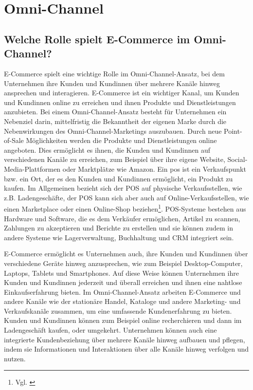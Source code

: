 \clearpage
\section{Omni-Channel}\label{hauptabschnitt_3}

\subsection{Welche Rolle spielt E-Commerce im Omni-Channel?}\label{unterabschnitt_3_1}
E-Commerce spielt eine wichtige Rolle im Omni-Channel-Ansatz, bei dem Unternehmen ihre Kunden und Kundinnen  über mehrere Kanäle hinweg ansprechen und interagieren. E-Commerce ist ein wichtiger Kanal, um Kunden und Kundinnen  online zu erreichen und ihnen Produkte und Dienstleistungen anzubieten.
\newline
Bei einem Omni-Channel-Ansatz besteht für Unternehmen ein Nebenziel darin, mittelfristig die Bekanntheit der eigenen Marke durch die Nebenwirkungen des Omni-Channel-Marketings auszubauen. Durch neue Point-of-Sale Möglichkeiten werden die Produkte und Dienstleistungen online angeboten. Dies ermöglicht es ihnen, die Kunden und Kundinnen auf verschiedenen Kanäle zu erreichen, zum Beispiel über ihre eigene Website, Social-Media-Plattformen oder Marktplätze wie Amazon.
\newline
Ein \ac{pos} ist ein Verkaufspunkt bzw. ein Ort, der es den Kunden und Kundinnen ermöglicht, ein Produkt zu kaufen. Im Allgemeinen bezieht sich der POS auf physische Verkaufsstellen, wie z.B. Ladengeschäfte, der POS kann sich aber auch auf Online-Verkaufsstellen, wie einen Marketplace oder einen Online-Shop beziehen\footnote{Vgl. \autocite [Online] {Kenning2018}}.
POS-Systeme bestehen aus Hardware und Software, die es dem Verkäufer ermöglichen, Artikel zu scannen, Zahlungen zu akzeptieren und Berichte zu erstellen und sie können zudem in andere Systeme wie Lagerverwaltung, Buchhaltung und CRM integriert sein.
\newline

E-Commerce ermöglicht es Unternehmen auch, ihre Kunden und Kundinnen über verschiedene Geräte hinweg anzusprechen, wie zum Beispiel Desktop-Computer, Laptops, Tablets und Smartphones. Auf diese Weise können Unternehmen ihre Kunden und Kundinnen  jederzeit und überall erreichen und ihnen eine nahtlose Einkaufserfahrung bieten.
\newline
Im Omni-Channel-Ansatz arbeiten E-Commerce und andere Kanäle wie der stationäre Handel, Kataloge und andere Marketing- und Verkaufskanäle zusammen, um eine umfassende Kundenerfahrung zu bieten. Kunden und Kundinnen  können zum Beispiel online recherchieren und dann im Ladengeschäft kaufen, oder umgekehrt. Unternehmen können auch eine integrierte Kundenbeziehung über mehrere Kanäle hinweg aufbauen und pflegen, indem sie Informationen und Interaktionen über alle Kanäle hinweg verfolgen und nutzen.
\newline

